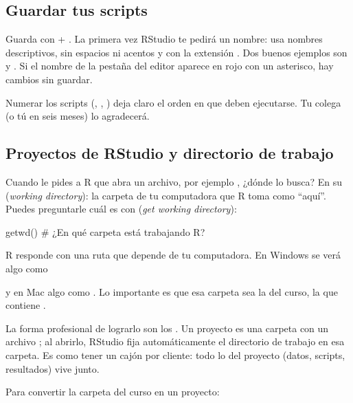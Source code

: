 \subsection{Guardar tus scripts}

Guarda con  + . La primera vez RStudio te pedirá un
nombre: usa nombres descriptivos, sin espacios ni acentos y con la
extensión . Dos buenos ejemplos son
 y . Si el nombre de la pestaña del editor
aparece en rojo con un asterisco, hay cambios sin guardar.

\begin{consejo}
Numerar los scripts (, ,
) deja claro el orden en que deben ejecutarse. Tu
colega (o tú en seis meses) lo agradecerá.
\end{consejo}

\subsection{Proyectos de RStudio y directorio de trabajo}

Cuando le pides a R que abra un archivo, por ejemplo
, ¿dónde lo busca? En su
 (\emph{working directory}): la carpeta de tu
computadora que R toma como ``aquí''. Puedes preguntarle cuál es con
 (\emph{get working directory}):

\begin{rcode}
getwd()   # ¿En qué carpeta está trabajando R?
\end{rcode}

R responde con una ruta que depende de tu computadora. En Windows se verá
algo como


y en Mac algo como . Lo importante es que
esa carpeta sea la del curso, la que contiene .

La forma profesional de lograrlo son los . Un
proyecto es una carpeta con un archivo ; al abrirlo, RStudio
fija automáticamente el directorio de trabajo en esa carpeta. Es como tener
un cajón por cliente: todo lo del proyecto (datos, scripts, resultados) vive
junto.

Para convertir la carpeta del curso en un proyecto:

